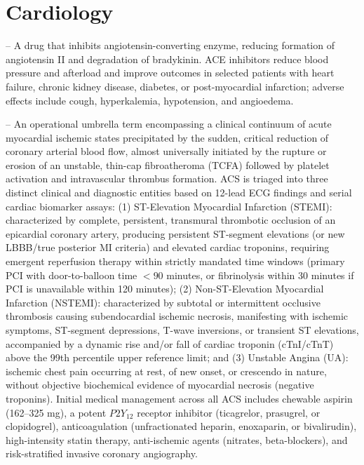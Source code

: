 \chapter{Cardiology}

-- A drug that inhibits angiotensin-converting enzyme, reducing formation of angiotensin II and degradation of bradykinin. ACE inhibitors reduce blood pressure and afterload and improve outcomes in selected patients with heart failure, chronic kidney disease, diabetes, or post-myocardial infarction; adverse effects include cough, hyperkalemia, hypotension, and angioedema.

-- An operational umbrella term encompassing a clinical continuum of acute myocardial ischemic states precipitated by the sudden, critical reduction of coronary arterial blood flow, almost universally initiated by the rupture or erosion of an unstable, thin-cap fibroatheroma (TCFA) followed by platelet activation and intravascular thrombus formation. ACS is triaged into three distinct clinical and diagnostic entities based on 12-lead ECG findings and serial cardiac biomarker assays: (1) ST-Elevation Myocardial Infarction (STEMI): characterized by complete, persistent, transmural thrombotic occlusion of an epicardial coronary artery, producing persistent ST-segment elevations (or new LBBB/true posterior MI criteria) and elevated cardiac troponins, requiring emergent reperfusion therapy within strictly mandated time windows (primary PCI with door-to-balloon time $<90$ minutes, or fibrinolysis within 30 minutes if PCI is unavailable within 120 minutes); (2) Non-ST-Elevation Myocardial Infarction (NSTEMI): characterized by subtotal or intermittent occlusive thrombosis causing subendocardial ischemic necrosis, manifesting with ischemic symptoms, ST-segment depressions, T-wave inversions, or transient ST elevations, accompanied by a dynamic rise and/or fall of cardiac troponin (cTnI/cTnT) above the 99th percentile upper reference limit; and (3) Unstable Angina (UA): ischemic chest pain occurring at rest, of new onset, or crescendo in nature, without objective biochemical evidence of myocardial necrosis (negative troponins). Initial medical management across all ACS includes chewable aspirin (162--325 mg), a potent $P2Y_{12}$ receptor inhibitor (ticagrelor, prasugrel, or clopidogrel), anticoagulation (unfractionated heparin, enoxaparin, or bivalirudin), high-intensity statin therapy, anti-ischemic agents (nitrates, beta-blockers), and risk-stratified invasive coronary angiography.

